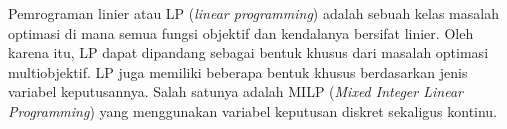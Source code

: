 Pemrograman linier atau LP (\textit{linear programming}) adalah sebuah kelas masalah optimasi di mana semua fungsi objektif dan kendalanya bersifat linier. Oleh karena itu, LP dapat dipandang sebagai bentuk khusus dari masalah optimasi multiobjektif. LP juga memiliki beberapa bentuk khusus berdasarkan jenis variabel keputusannya. Salah satunya adalah MILP (\textit{Mixed Integer Linear Programming}) yang menggunakan variabel keputusan diskret sekaligus kontinu. 
